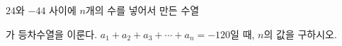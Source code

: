 $24$와 $-44$ 사이에 $n$개의 수를 넣어서 만든 수열 \par\smallskip{}\par\smallskip\noindent 가 등차수열을 이룬다. $a_1+a_2+a_3+\cdots+a_n=-120$일 때, $n$의 값을 구하시오.
